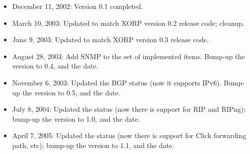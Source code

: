 \documentclass[11pt]{article}
\begin{document}
\begin{itemize}

  \item December 11, 2002: Version 0.1 completed.

  \item March 10, 2003: Updated to match XORP version 0.2 release code;
  cleanup.

  \item June 9, 2003: Updated to match XORP version 0.3 release code.

  \item August 28, 2003: Add SNMP to the set of implemented items. Bump-up the
  version to 0.4, and the date.

  \item November 6, 2003: Updated the BGP status (now it supports
  IPv6). Bump-up the version to 0.5, and the date.

  \item July 8, 2004: Updated the status (now there is support for RIP and
  RIPng); bump-up the version to 1.0, and the date.

  \item April 7, 2005: Updated the status (now there is support for
  Click forwarding path, etc); bump-up the version to 1.1, and the date.

\end{itemize}





\end{document}
